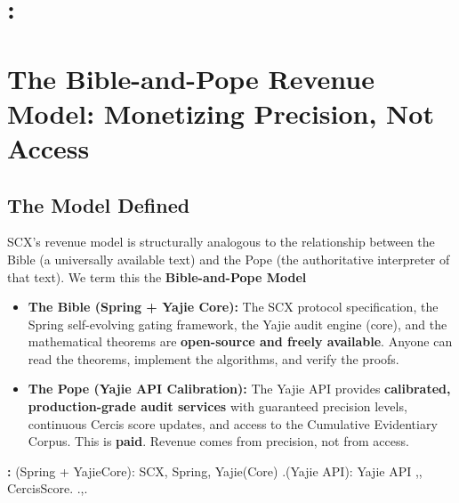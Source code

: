 \documentclass[12pt,a4paper]{article}
\theoremstyle{remark}
\begin{document}
\section{:}
\section{The Bible-and-Pope Revenue Model: Monetizing Precision, Not Access}
\subsection{The Model Defined}
SCX's revenue model is structurally analogous to the relationship between 
the Bible (a universally available text) and the Pope (the authoritative 
interpreter of that text). We term this the \textbf{Bible-and-Pope Model} 
\begin{itemize}
 \item \textbf{The Bible (Spring + Yajie Core):} The SCX protocol specification, 
 the Spring self-evolving gating framework, the Yajie audit engine (core), 
 and the mathematical theorems are \textbf{open-source and freely available}. 
 Anyone can read the theorems, implement the algorithms, and verify the proofs.
 \item \textbf{The Pope (Yajie API Calibration):} The Yajie API provides 
 \textbf{calibrated, production-grade audit services} with guaranteed 
 precision levels, continuous Cercis score updates, and access to the 
 Cumulative Evidentiary Corpus. This is \textbf{paid}. Revenue comes from 
 precision, not from access.
\end{itemize}
\noindent\textbf{: }
(Spring + YajieCore): SCX, Spring, Yajie(Core)
.(Yajie API): Yajie API
,, CercisScore.
.,.
\end{document}
